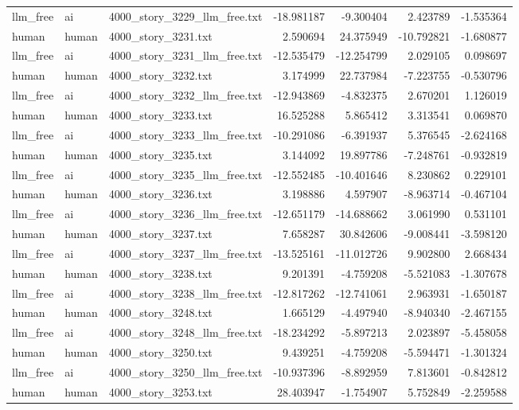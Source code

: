 \begin{longtable}{lllrrrr}
llm\_free & ai & 4000\_story\_3229\_llm\_free.txt & -18.981187 & -9.300404 & 2.423789 & -1.535364 \\
human & human & 4000\_story\_3231.txt & 2.590694 & 24.375949 & -10.792821 & -1.680877 \\
llm\_free & ai & 4000\_story\_3231\_llm\_free.txt & -12.535479 & -12.254799 & 2.029105 & 0.098697 \\
human & human & 4000\_story\_3232.txt & 3.174999 & 22.737984 & -7.223755 & -0.530796 \\
llm\_free & ai & 4000\_story\_3232\_llm\_free.txt & -12.943869 & -4.832375 & 2.670201 & 1.126019 \\
human & human & 4000\_story\_3233.txt & 16.525288 & 5.865412 & 3.313541 & 0.069870 \\
llm\_free & ai & 4000\_story\_3233\_llm\_free.txt & -10.291086 & -6.391937 & 5.376545 & -2.624168 \\
human & human & 4000\_story\_3235.txt & 3.144092 & 19.897786 & -7.248761 & -0.932819 \\
llm\_free & ai & 4000\_story\_3235\_llm\_free.txt & -12.552485 & -10.401646 & 8.230862 & 0.229101 \\
human & human & 4000\_story\_3236.txt & 3.198886 & 4.597907 & -8.963714 & -0.467104 \\
llm\_free & ai & 4000\_story\_3236\_llm\_free.txt & -12.651179 & -14.688662 & 3.061990 & 0.531101 \\
human & human & 4000\_story\_3237.txt & 7.658287 & 30.842606 & -9.008441 & -3.598120 \\
llm\_free & ai & 4000\_story\_3237\_llm\_free.txt & -13.525161 & -11.012726 & 9.902800 & 2.668434 \\
human & human & 4000\_story\_3238.txt & 9.201391 & -4.759208 & -5.521083 & -1.307678 \\
llm\_free & ai & 4000\_story\_3238\_llm\_free.txt & -12.817262 & -12.741061 & 2.963931 & -1.650187 \\
human & human & 4000\_story\_3248.txt & 1.665129 & -4.497940 & -8.940340 & -2.467155 \\
llm\_free & ai & 4000\_story\_3248\_llm\_free.txt & -18.234292 & -5.897213 & 2.023897 & -5.458058 \\
human & human & 4000\_story\_3250.txt & 9.439251 & -4.759208 & -5.594471 & -1.301324 \\
llm\_free & ai & 4000\_story\_3250\_llm\_free.txt & -10.937396 & -8.892959 & 7.813601 & -0.842812 \\
human & human & 4000\_story\_3253.txt & 28.403947 & -1.754907 & 5.752849 & -2.259588 \\

\end{longtable}
